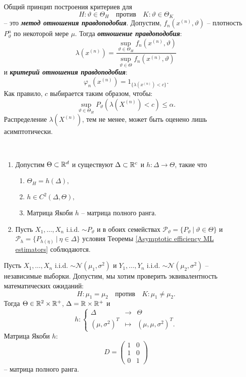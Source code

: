 \begin{rmrk}
	Общий принцип построения критериев для
	\[ H:\vartheta \in \Theta_H \quad \text{против} \quad K:\vartheta \in \Theta_K \]
	-- это \textbf{\textit{метод отношения правдоподобия}}. Допустим, $f_n(x^{(n)},\vartheta)$ -- плотность $P_\vartheta^n$ по некоторой мере $\mu$. Тогда \textbf{\textit{отношение правдоподобия}}:
	\[ \lambda(x^{(n)})=\frac{\sup_{\vartheta \in \Theta_H}f_n(x^{(n)},\vartheta)}{\sup_{\vartheta \in \Theta}f_n(x^{(n)},\vartheta)} \]
	и \textbf{\textit{критерий отношения правдоподобия}}:
	\[ \varphi_n(x^{(n)})=1_{\{\lambda(x^{(n)})<c \}}. \]
	Как правило, $c$ выбирается таким образом, чтобы:
	\[ \sup_{\vartheta \in \Theta_H} P_\vartheta(\lambda(X^{(n)})<c) \leq \alpha. \]
	Распределение $\lambda(X^{(n)})$, тем не менее, может быть оценено лишь асимптотически.
\end{rmrk}

\begin{cond} \label{Conditions LR} \
	\begin{enumerate}
		\item Допустим $\Theta \subset \mathbb{R}^d$ и существуют $\Delta \subset \mathbb{R}^c$ и $h:\Delta \rightarrow \Theta$, такие что
		\begin{enumerate}
			\item $\Theta_H = h(\Delta),$
			\item $h \in C^2(\Delta, \Theta),$
			\item Матрица Якоби $h$ -- матрица полного ранга.
		\end{enumerate}
		\item Пусть $X_1, \dots, X_n$ i.i.d. $\sim P_\vartheta$ и в обоих семействах $\mathcal{P}_\vartheta = \{ P_\vartheta\ |\ \vartheta \in \Theta \}$ и $\mathcal{P}_h = \{P_{h(\eta)}\ |\ \eta \in \Delta\}$ условия Теоремы \ref{Asymptotic efficiency ML estimators} соблюдаются.
    \end{enumerate}
\end{cond}

\begin{exmp} \label{exmp7.6}
	Пусть $X_1, \dots, X_n$ i.i.d. $\sim \mathcal{N}(\mu_1, \sigma^2)$ и $Y_1, \dots, Y_n$ i.i.d. $\sim \mathcal{N}(\mu_2, \sigma^2)$ -- независимые выборки. Допустим, мы хотим проверить эквивалентность математических ожиданий:
	\[ H: \mu_1 = \mu_2 \quad \text{против} \quad K:\mu_1 \neq \mu_2. \]
	Тогда $\Theta \in \mathbb{R}^2 \times \mathbb{R}^+$, $\Delta = \mathbb{R} \times \mathbb{R}^+$ и
	\[ h :
	\left \{
	\begin{array}{ccl}
	\Delta & \rightarrow & \Theta \\
	(\mu, \sigma^2)^T & \mapsto & (\mu, \mu, \sigma^2)^T.
	\end{array}
	\right.
	\]
	Матрица Якоби $h$:
	\[D = \begin{pmatrix}
	1 & 0 \\
	1 & 0 \\
	0 & 1
	\end{pmatrix} \]
	-- матрица полного ранга.
\end{exmp}

